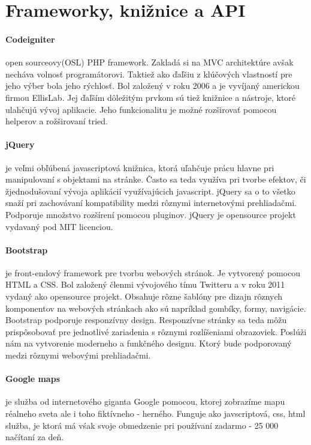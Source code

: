 \section{Frameworky, knižnice a API}

\paragraph{Codeigniter} open sourceovy(OSL) PHP framework. Zakladá si na MVC architektúre avšak necháva volnosť programátorovi. Taktiež ako ďaľšiu z klúčových vlastností pre jeho výber bola jeho rýchlosť\cite{codeigniter-guide}. Bol založený v roku 2006 a je vyvíjaný americkou firmou EllisLab. Jej ďaľším dôležitým prvkom sú tiež knižnice a nástroje, ktoré ulahčujú vývoj aplikacie. Jeho funkcionalitu je možné rozširovať pomocou helperov a rožširovaní tried.

\paragraph{jQuery} je veľmi obľúbená\cite{jquery-usage} javascriptová knižnica, ktorá uľahčuje prácu hlavne pri manipulovaní s objektami na stránke. Často sa teda využíva pri tvorbe efektov, či žjednodušovaní vývoja aplikácií využívajúcich javascript. jQuery sa o to všetko snaží pri zachovávaní kompatibility medzi rôznymi internetovými prehliadačmi\cite{jquery-browsers}. Podporuje množstvo rozšírení pomocou pluginov\cite{jquery-plugins}. jQuery je opensource projekt vydavaný pod MIT licenciou. 

\paragraph{Bootstrap} je front-endový framework pre tvorbu webových stránok. Je vytvorený pomocou HTML a CSS. Bol založený členmi vývojového tímu Twitteru a v roku 2011 vydaný ako opensource projekt\cite{bootstrap-about}. Obsahuje rôzne šablóny pre dizajn rôznych komponentov na webových stránkach ako sú napríklad gombíky, formy, navigácie. Bootstrap podporuje responzívny design. Responzívne stránky sa teda môžu prispôsobovať pre jednotlivé zariadenia s rôznymi rozlíšeniami obrazoviek. Poslúži nám na vytvorenie moderneho a funkčného designu. Ktorý bude podporovaný medzi rôznymi webovými prehliadačmi.


\paragraph{Google maps} je služba od internetového giganta Google pomocou, ktorej zobrazíme mapu réalneho sveta ale i toho fiktívneho - herného. Funguje ako javscriptová, css, html služba, je ktorá má vśak svoje obmedzenie pri používaní zadarmo - 25 000 načítaní za deň\cite{gmaps-usage}.


